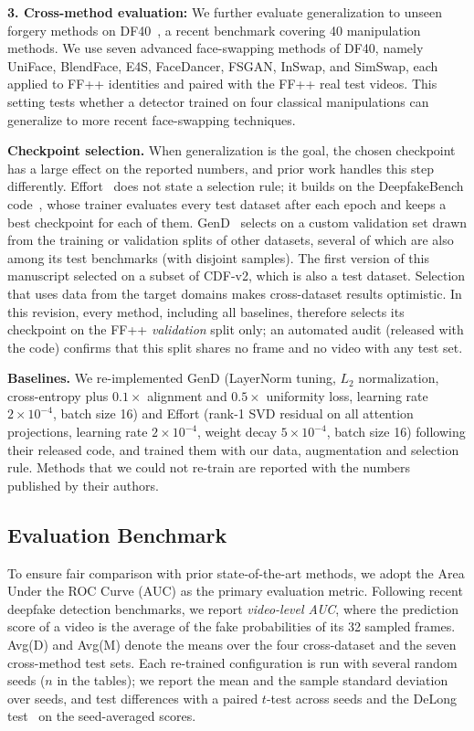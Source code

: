 \documentclass[fonts]{icst}
\begin{document}
\textbf{3. Cross-method evaluation:}
We further evaluate generalization to unseen forgery methods on DF40~\cite{yan2024df40}, a recent benchmark covering 40 manipulation methods.
We use seven advanced face-swapping methods of DF40, namely UniFace, BlendFace, E4S, FaceDancer, FSGAN, InSwap, and SimSwap, each applied to FF++ identities and paired with the FF++ real test videos.
This setting tests whether a detector trained on four classical manipulations can generalize to more recent face-swapping techniques.

\noindent\textbf{Checkpoint selection.}\label{sec:selection}
When generalization is the goal, the chosen checkpoint has a large effect on the reported numbers, and prior work handles this step differently. Effort~\cite{yan2025effort} does not state a selection rule; it builds on the DeepfakeBench code~\cite{yan2023deepfakebench}, whose trainer evaluates every test dataset after each epoch and keeps a best checkpoint for each of them. GenD~\cite{yermakov2025gend} selects on a custom validation set drawn from the training or validation splits of other datasets, several of which are also among its test benchmarks (with disjoint samples). The first version of this manuscript selected on a subset of CDF-v2, which is also a test dataset. Selection that uses data from the target domains makes cross-dataset results optimistic. In this revision, every method, including all baselines, therefore selects its checkpoint on the FF++ \emph{validation} split only; an automated audit (released with the code) confirms that this split shares no frame and no video with any test set.

\noindent\textbf{Baselines.}
We re-implemented GenD (LayerNorm tuning, $L_2$ normalization, cross-entropy plus $0.1\times$ alignment and $0.5\times$ uniformity loss, learning rate $2\times10^{-4}$, batch size 16) and Effort (rank-1 SVD residual on all attention projections, learning rate $2\times10^{-4}$, weight decay $5\times10^{-4}$, batch size 16) following their released code, and trained them with our data, augmentation and selection rule. Methods that we could not re-train are reported with the numbers published by their authors.

\subsection{Evaluation Benchmark}

To ensure fair comparison with prior state-of-the-art methods, we adopt the Area Under the ROC Curve (AUC) as the primary evaluation metric.
Following recent deepfake detection benchmarks, we report \textit{video-level AUC}, where the prediction score of a video is the average of the fake probabilities of its 32 sampled frames.
Avg(D) and Avg(M) denote the means over the four cross-dataset and the seven cross-method test sets.
Each re-trained configuration is run with several random seeds ($n$ in the tables); we report the mean and the sample standard deviation over seeds, and test differences with a paired $t$-test across seeds and the DeLong test~\cite{delong1988} on the seed-averaged scores.
\end{document}

